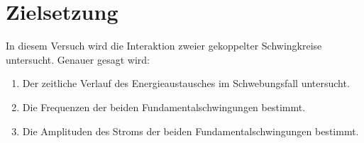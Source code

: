 \section{Zielsetzung}
\label{sec:Zielsetzung}

In diesem Versuch wird die Interaktion zweier gekoppelter Schwingkreise untersucht.
Genauer gesagt wird:
\begin{enumerate}[label=\alph*)]
    \item Der zeitliche Verlauf des Energieaustausches im Schwebungsfall untersucht.
    \item Die Frequenzen der beiden Fundamentalschwingungen bestimmt.
    \item Die Amplituden des Stroms der beiden Fundamentalschwingungen bestimmt.
\end{enumerate}